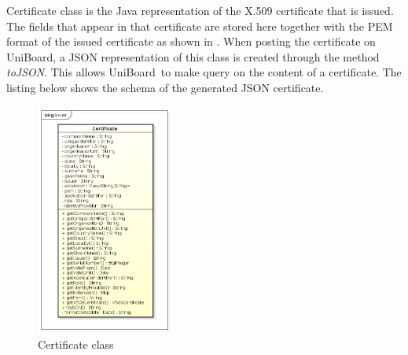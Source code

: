 \documentclass[oneside]{scrreprt}
\newcommand{\uniboard}{\mbox{UniBoard}}
\begin{document}
Certificate class is the Java representation of the X.509 certificate that is issued. The fields that appear in that certificate are stored here together with the PEM format of the issued certificate as shown in . When posting the certificate on \uniboard, a JSON representation of this class is created through the method \textit{toJSON}. This allows \uniboard\ to make query on the content of a certificate. The listing below shows the schema of the generated JSON certificate.

\begin{figure}[ht]
\centerline{
\includegraphics[width=0.4\textwidth]{figs/certificate_class.png}}
\caption{Certificate class}
\label{fig:certificate}
\end{figure}
\end{document}
